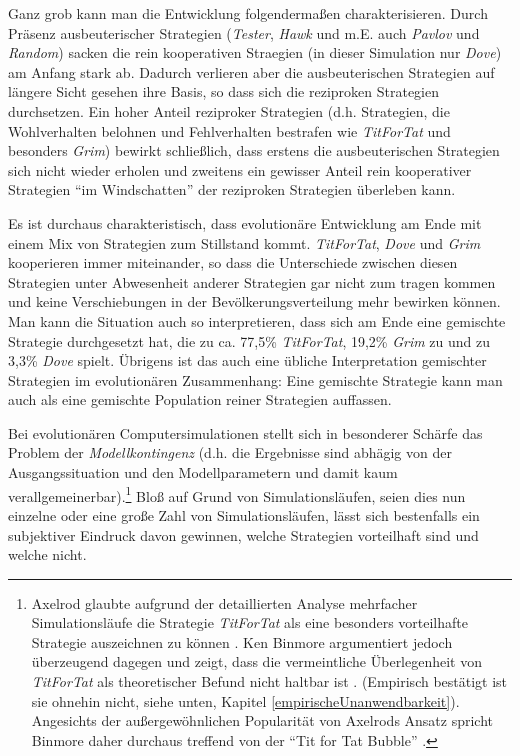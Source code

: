 Ganz grob kann man die Entwicklung folgendermaßen charakterisieren. Durch
Präsenz ausbeuterischer Strategien ({\em Tester}, {\em Hawk} und m.E. auch {\em
Pavlov} und {\em Random}) sacken die rein kooperativen Straegien (in dieser
Simulation nur {\em Dove}) am Anfang stark ab. Dadurch verlieren aber die
ausbeuterischen Strategien auf längere Sicht gesehen ihre Basis, so dass sich
die reziproken Strategien durchsetzen. Ein hoher Anteil reziproker Strategien
(d.h. Strategien, die Wohlverhalten belohnen und Fehlverhalten bestrafen wie
{\em TitForTat} und besonders {\em Grim}) bewirkt schließlich, 
dass erstens die ausbeuterischen Strategien sich nicht wieder erholen
und zweitens ein gewisser Anteil rein kooperativer Strategien "`im
Windschatten"' der reziproken Strategien überleben kann. 

Es ist durchaus charakteristisch, dass evolutionäre Entwicklung am Ende mit
einem Mix von Strategien zum Stillstand kommt. {\em TitForTat}, {\em Dove} und
{\em Grim} kooperieren immer miteinander, so dass die Unterschiede zwischen
diesen Strategien unter Abwesenheit anderer Strategien gar nicht zum tragen
kommen und keine Verschiebungen in der Bevölkerungsverteilung mehr bewirken
können. Man kann die Situation auch so interpretieren, dass sich am Ende eine
gemischte Strategie durchgesetzt hat, die zu ca. 77,5\% {\em TitForTat}, 19,2\%
{\em Grim} zu und zu 3,3\% {\em Dove} spielt. Übrigens ist das auch
eine übliche Interpretation gemischter Strategien im evolutionären Zusammenhang:
Eine gemischte Strategie kann man auch als eine
gemischte Population reiner Strategien auffassen.

Bei evolutionären Computersimulationen stellt sich in besonderer Schärfe das
Problem der {\em Modellkontingenz} (d.h. die Ergebnisse sind abhägig von der
Ausgangssituation und den Modellparametern und damit kaum
verallgemeinerbar).\footnote{Axelrod glaubte aufgrund der detaillierten Analyse
mehrfacher Simulationsläufe die Strategie {\em TitForTat} als eine besonders
vorteilhafte Strategie auszeichnen zu können \cite[S. 25ff, S.
29ff.]{axelrod:1984}. Ken Binmore argumentiert jedoch überzeugend dagegen und
zeigt, dass die vermeintliche Überlegenheit von {\em TitForTat} als theoretischer
Befund nicht haltbar ist \cite[S. 313]{binmore:1998}. (Empirisch bestätigt ist
sie ohnehin nicht, siehe unten, Kapitel \ref{empirischeUnanwendbarkeit}).
Angesichts der außergewöhnlichen Popularität von Axelrods Ansatz spricht Binmore
daher durchaus treffend von der "`Tit for Tat Bubble"' \cite[S.
194]{binmore:1994}.} Bloß auf Grund von Simulationsläufen, seien dies nun
einzelne oder eine große Zahl von Simulationsläufen, lässt sich bestenfalls ein
subjektiver Eindruck davon gewinnen, welche Strategien vorteilhaft sind und
welche nicht.

